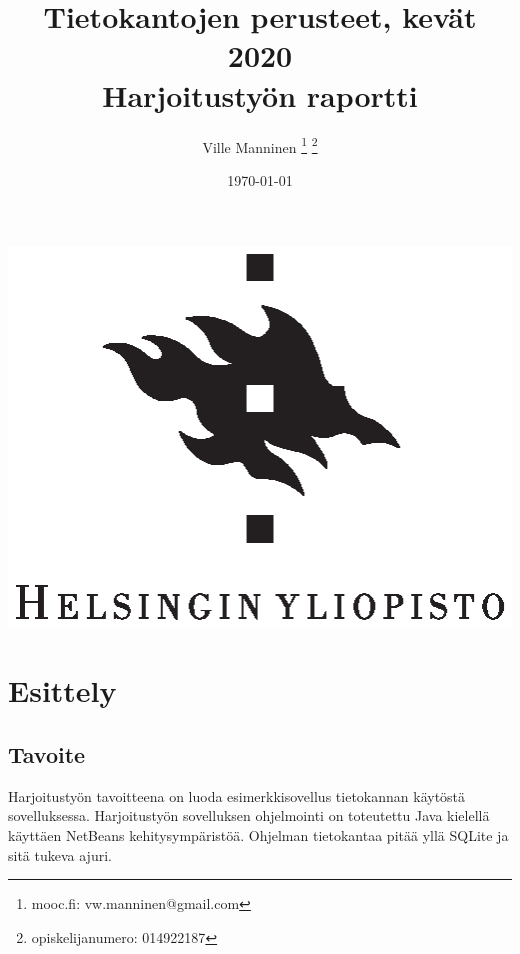 \documentclass[11pt,a4paper]{article}
\begin{document}
\author{Ville Manninen
\thanks{mooc.fi: vw.manninen@gmail.com}
\thanks{opiskelijanumero: 014922187}}
\date{\today}
\title{Tietokantojen perusteet, kevät 2020 \\
Harjoitustyön raportti}
\clearpage \maketitle
\thispagestyle{empty}
\begin{center}
\vspace{2cm}
\includegraphics{university-of-helsinki-2.eps} 
\end{center}
\newpage
\tableofcontents
\newpage
\section{Esittely}

\subsection{Tavoite}
Harjoitustyön tavoitteena on luoda esimerkkisovellus tietokannan käytöstä sovelluksessa.
Harjoitustyön sovelluksen ohjelmointi on toteutettu Java kielellä käyttäen NetBeans kehitysympäristöä. Ohjelman tietokantaa pitää yllä SQLite ja sitä tukeva ajuri.
\end{document}
